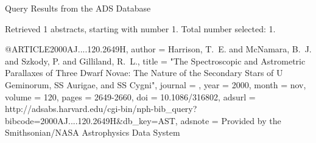 Query Results from the ADS Database


Retrieved 1 abstracts, starting with number 1.  Total number selected: 1.

@ARTICLE{2000AJ....120.2649H,
   author = {{Harrison}, T.~E. and {McNamara}, B.~J. and {Szkody}, P. and 
	{Gilliland}, R.~L.},
    title = "{The Spectroscopic and Astrometric Parallaxes of Three Dwarf Novae: The Nature of the Secondary Stars of U Geminorum, SS Aurigae, and SS Cygni}",
  journal = {\aj},
     year = 2000,
    month = nov,
   volume = 120,
    pages = {2649-2660},
      doi = {10.1086/316802},
   adsurl = {http://adsabs.harvard.edu/cgi-bin/nph-bib_query?bibcode=2000AJ....120.2649H&db_key=AST},
  adsnote = {Provided by the Smithsonian/NASA Astrophysics Data System}
}


